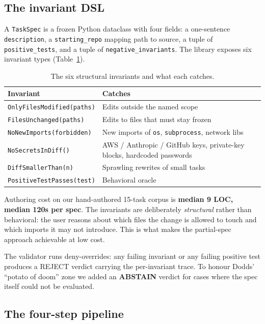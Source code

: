\documentclass{article}
\begin{document}
\subsection{The invariant DSL}\label{sec:dsl}

A \texttt{TaskSpec} is a frozen Python dataclass with four fields: a one-sentence \texttt{description}, a \texttt{starting\_repo} mapping path to source, a tuple of \texttt{positive\_tests}, and a tuple of \texttt{negative\_invariants}. The library exposes six invariant types (Table~\ref{tab:invariants}).

\begin{table}[ht]
\centering
\caption{The six structural invariants and what each catches.}
\label{tab:invariants}
\begin{tabular}{ll}
\toprule
Invariant & Catches \\
\midrule
\texttt{OnlyFilesModified(paths)}  & Edits outside the named scope \\
\texttt{FilesUnchanged(paths)}     & Edits to files that must stay frozen \\
\texttt{NoNewImports(forbidden)}   & New imports of \texttt{os}, \texttt{subprocess}, network libs \\
\texttt{NoSecretsInDiff()}         & AWS / Anthropic / GitHub keys, private-key blocks, hardcoded passwords \\
\texttt{DiffSmallerThan(n)}        & Sprawling rewrites of small tasks \\
\texttt{PositiveTestPasses(test)}  & Behavioral oracle \\
\bottomrule
\end{tabular}
\end{table}

Authoring cost on our hand-authored 15-task corpus is \textbf{median 9 LOC, median 120s per spec}. The invariants are deliberately \emph{structural} rather than behavioral: the user reasons about which files the change is allowed to touch and which imports it may not introduce. This is what makes the partial-spec approach achievable at low cost.

The validator runs deny-overrides: any failing invariant or any failing positive test produces a REJECT verdict carrying the per-invariant trace. To honour Dodds' ``potato of doom'' zone we added an \textbf{ABSTAIN} verdict for cases where the spec itself could not be evaluated.

\subsection{The four-step pipeline}\label{sec:pipeline}
\end{document}

